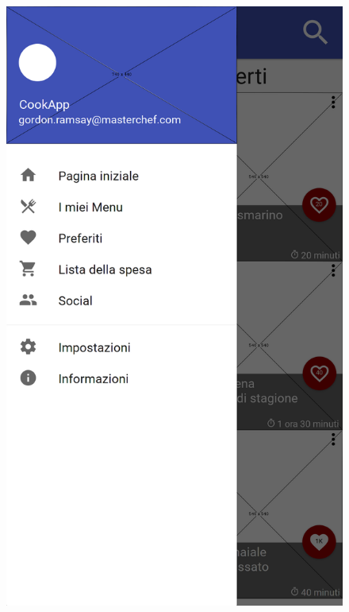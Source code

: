 \begin{figure}[H]
	\begin{minipage}{.49\textwidth}
		\includegraphics[width=\textwidth]{img/wireframe/menu.png}
	\end{minipage}
	\begin{minipage}{.49\textwidth}

\end{minipage}
\end{figure}
